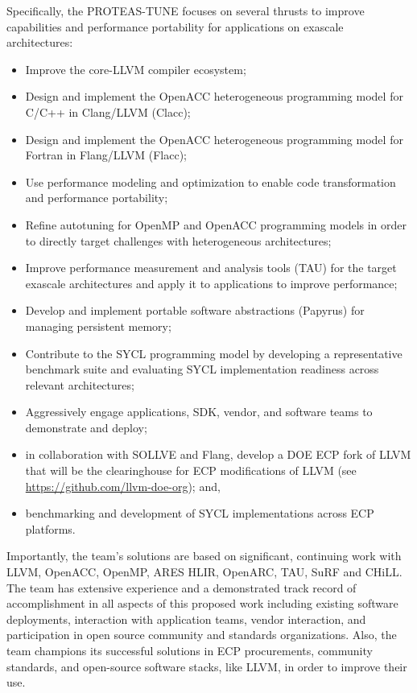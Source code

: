 Specifically, the PROTEAS-TUNE focuses on several thrusts to improve capabilities and performance portability for applications on exascale architectures: 

\begin{itemize}
\item 
    Improve the core-LLVM compiler ecosystem; 
\item 
	Design and implement the OpenACC heterogeneous programming model for C/C++ in Clang/LLVM (Clacc);
\item 
    Design and implement the OpenACC heterogeneous programming model for Fortran in Flang/LLVM (Flacc);  
    
\item 
	Use performance modeling and optimization to enable code transformation and performance portability;
\item 
	Refine autotuning for OpenMP and OpenACC programming models in order to directly target challenges with heterogeneous architectures;
\item 
    Improve performance measurement and analysis tools (TAU) for the target exascale architectures and apply it to applications to improve performance;
\item 
    Develop and implement portable software abstractions (Papyrus) for managing persistent memory;
\item 
    Contribute to the SYCL programming model by developing a representative benchmark suite and evaluating SYCL implementation readiness across relevant architectures;
\item 
    Aggressively engage applications, SDK, vendor, and software teams to demonstrate and deploy;
\item
    in collaboration with SOLLVE and Flang, develop a DOE ECP fork of LLVM that will be the clearinghouse for ECP modifications of LLVM  (see \url{https://github.com/llvm-doe-org}); and,
\item
    benchmarking and development of SYCL implementations across ECP platforms.
    
\end{itemize}

Importantly, the team’s solutions are based on significant, continuing work with LLVM, OpenACC, OpenMP, ARES HLIR, OpenARC, TAU, SuRF and CHiLL. 
The team has extensive experience and a demonstrated track record of accomplishment in all aspects of this proposed work including existing software deployments, interaction with application teams, vendor interaction, and participation in open source community and standards organizations. 
Also, the team champions its successful solutions in ECP procurements, community standards, and open-source software stacks, like LLVM, in order to improve their use.

